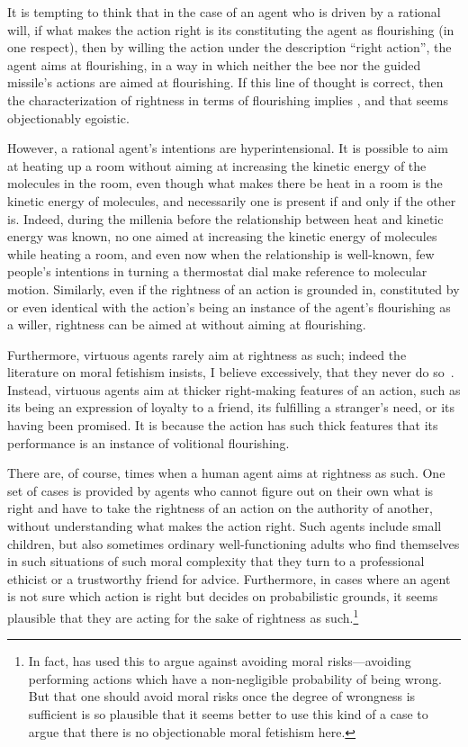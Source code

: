 It is tempting to think that in the case of an agent who is driven by a rational will, if what makes the action 
right is its constituting the agent as flourishing (in one respect), then by willing the action under the
description ``right action'', the agent aims at flourishing, in a way in which neither the bee nor the guided missile's
actions are aimed at flourishing. If this line of thought is correct, then the characterization of rightness in terms of 
flourishing implies , and that seems objectionably egoistic.

However, a rational agent's intentions are hyperintensional. It is possible to aim at heating up a room without aiming
at increasing the kinetic energy of the molecules in the room, even though what makes there be heat in a room is the
kinetic energy of molecules, and necessarily one is present if and only if the other is. Indeed, during the millenia 
before the relationship between heat and kinetic energy was known, no one aimed at increasing the kinetic energy of 
molecules while heating a room, and even now when the relationship is well-known, few people's intentions in turning 
a thermostat dial make reference to molecular motion. Similarly, even if the rightness of an action is grounded in, constituted 
by or even identical with the action's being an instance of the agent's flourishing as a willer, rightness can be 
aimed at without aiming at flourishing.

Furthermore, virtuous agents rarely aim at 
rightness as such; indeed the literature on moral fetishism insists, I believe excessively, that they
never do so~\parencite[p.~75]{SmithMoralProblem}. Instead, virtuous agents aim at thicker right-making features of an action, such as its being an expression
of loyalty to a friend, its fulfilling a stranger's need, or its having been promised. It is because the action has
such thick features that its performance is an instance of volitional flourishing. 

There are, of course, times when a human agent aims at rightness as such. One set of cases is provided by agents who cannot
figure out on their own what is right and have to take the rightness of an action on the authority of another, without
understanding what makes the action right. Such agents include small children, but also sometimes ordinary well-functioning
adults who find themselves in such situations of such moral complexity that they turn to a professional ethicist or a 
trustworthy friend for advice. Furthermore, in cases where an agent is not sure which action is right but decides on
probabilistic grounds, it seems plausible that they are acting for the sake of rightness as such.\footnote{In fact, 
 has used this to argue against avoiding moral risks---avoiding performing actions
which have a non-negligible probability of being wrong. But that one should avoid moral risks once the degree of
wrongness is sufficient is so plausible that it seems
better to use this kind of a case to argue that there is no objectionable moral fetishism here.}

